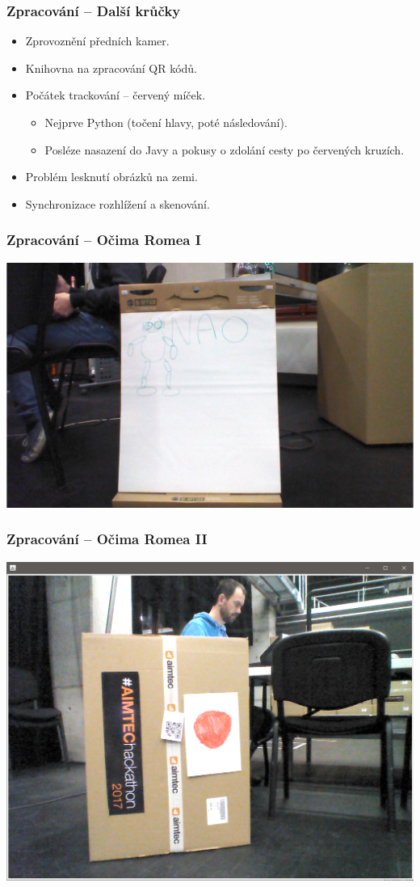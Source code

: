 \documentclass{beamer}
\begin{document}
\begin{frame}
\frametitle{Zpracování -- Další krůčky}  
	\begin{itemize}
		\item{Zprovoznění předních kamer.}
		\item{Knihovna na zpracování QR kódů.}						
		\item{Počátek trackování -- červený míček.}
			\begin{itemize}
				\item{Nejprve Python (točení hlavy, poté následování).}
				\item{Posléze nasazení do Javy a pokusy o zdolání cesty po červených kruzích.}
			\end{itemize}
	\item{Problém lesknutí obrázků na zemi.}
	\item{Synchronizace rozhlížení a skenování.}	
	\end{itemize}
 
\end{frame}

\begin{frame}
\frametitle{Zpracování -- Očima Romea I}  
	\includegraphics[width=\textwidth]{img/nao_jeho_pohled.png}	 
\end{frame}

\begin{frame}
\frametitle{Zpracování -- Očima Romea II}  
	\includegraphics[width=\textwidth]{img/nao_jeho_pohled2.png}	 
\end{frame}
\end{document}
